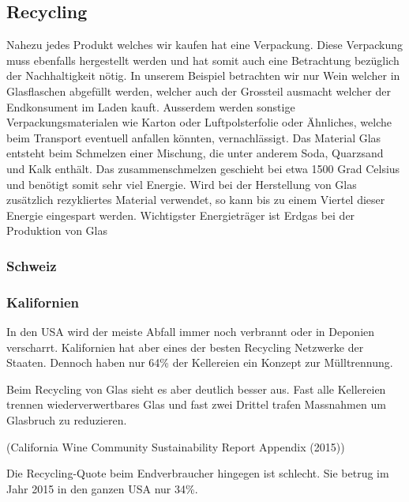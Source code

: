 \subsection{Recycling}
Nahezu jedes Produkt welches wir kaufen hat eine Verpackung. Diese Verpackung muss ebenfalls hergestellt werden und hat somit auch eine Betrachtung bezüglich der Nachhaltigkeit nötig. In unserem Beispiel betrachten wir nur Wein welcher in Glasflaschen abgefüllt werden, welcher auch der Grossteil ausmacht welcher der Endkonsument im Laden kauft. Ausserdem werden sonstige Verpackungsmaterialen wie Karton oder Luftpolsterfolie oder Ähnliches, welche beim Transport eventuell anfallen könnten, vernachlässigt. 
Das Material Glas entsteht beim Schmelzen einer Mischung, die unter anderem Soda, Quarzsand und Kalk enthält. Das zusammenschmelzen geschieht bei etwa 1500 Grad Celsius und benötigt somit sehr viel Energie. Wird bei der Herstellung von Glas zusätzlich rezykliertes Material verwendet, so kann bis zu einem Viertel dieser Energie eingespart werden. Wichtigster Energieträger ist Erdgas bei der Produktion von Glas
\subsubsection{Schweiz}



\subsubsection{Kalifornien}
In den USA wird der meiste Abfall immer noch verbrannt oder in Deponien verscharrt. Kalifornien hat
aber eines der besten Recycling Netzwerke der Staaten. Dennoch haben nur 64\%  der Kellereien ein
Konzept zur Mülltrennung. 

Beim Recycling von Glas sieht es aber deutlich besser aus. Fast alle Kellereien trennen
wiederverwertbares Glas und fast zwei Drittel trafen Massnahmen um Glasbruch zu reduzieren.

(\glqq{}California Wine Community Sustainability Report Appendix\grqq{} (2015))

Die Recycling-Quote beim Endverbraucher hingegen ist schlecht. Sie betrug im Jahr 2015 in den ganzen
USA nur 34\%. 
